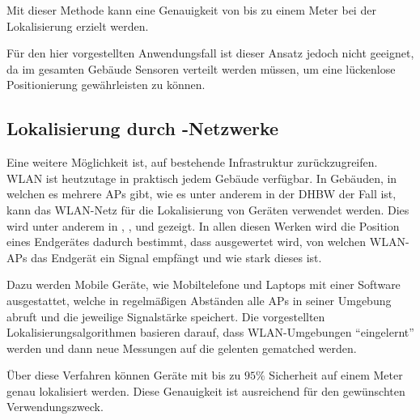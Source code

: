 Mit dieser Methode kann eine Genauigkeit von bis zu einem Meter bei der Lokalisierung erzielt
werden.

Für den hier vorgestellten Anwendungsfall ist dieser Ansatz jedoch nicht geeignet, da im gesamten
Gebäude Sensoren verteilt werden müssen, um eine lückenlose Positionierung gewährleisten zu können.

\subsection{Lokalisierung durch -Netzwerke}

Eine weitere Möglichkeit ist, auf bestehende Infrastruktur zurückzugreifen. \Gls{WLAN} ist
heutzutage in praktisch jedem Gebäude verfügbar.
In Gebäuden, in welchen es mehrere \glspl{AP} gibt, wie es unter anderem in der \gls{DHBW} der Fall
ist, kann das \gls{WLAN}-Netz für die Lokalisierung von Geräten verwendet werden. Dies wird unter
anderem in \cite{Xiang2004}, \cite{Dong2009}, \cite{Paschalidis2009} und \cite{Liang2009} gezeigt.
In allen diesen Werken wird die Position eines Endgerätes dadurch bestimmt, dass ausgewertet wird,
von welchen \gls{WLAN}-\glspl{AP} das Endgerät ein Signal empfängt und wie stark dieses ist.

Dazu werden Mobile Geräte, wie Mobiltelefone und Laptops mit einer Software ausgestattet, welche in
regelmäßigen Abständen alle \glspl{AP} in seiner Umgebung abruft und die jeweilige Signalstärke
speichert. Die vorgestellten Lokalisierungsalgorithmen basieren darauf, dass \gls{WLAN}-Umgebungen
\enquote{eingelernt} werden und dann neue Messungen auf die gelenten gematched werden.

Über diese Verfahren können Geräte mit bis zu $95\%$ Sicherheit auf einem Meter genau lokalisiert
werden. Diese Genauigkeit ist ausreichend für den gewünschten Verwendungszweck.

